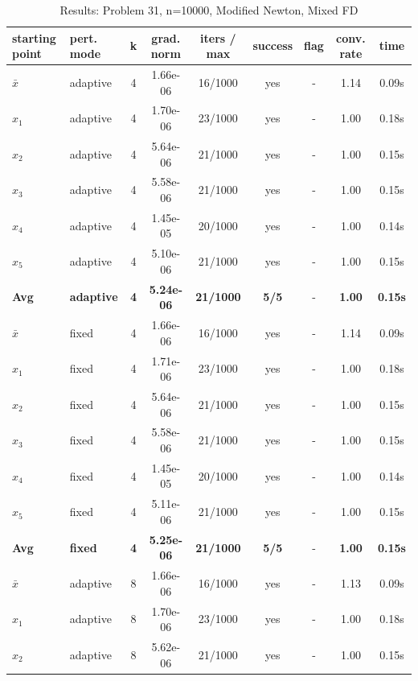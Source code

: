 \begin{longtable}{|l|l|c|c|c|c|c|c|c|}
\caption{Results: Problem 31, n=10000, Modified Newton, Mixed FD} \\
\hline
\textbf{starting point} & \textbf{pert. mode} & \textbf{k} & \textbf{grad. norm} & \textbf{iters / max} & \textbf{success} & \textbf{flag} & \textbf{conv. rate} & \textbf{time} \\
\hline
\endfirsthead
\endhead
\endfoot
\hline
\endlastfoot
$\bar{x}$ & adaptive & 4 & 1.66e-06 & 16/1000 & yes & - & 1.14 & 0.09s \\
\hline
$x_1$ & adaptive & 4 & 1.70e-06 & 23/1000 & yes & - & 1.00 & 0.18s \\
\hline
$x_2$ & adaptive & 4 & 5.64e-06 & 21/1000 & yes & - & 1.00 & 0.15s \\
\hline
$x_3$ & adaptive & 4 & 5.58e-06 & 21/1000 & yes & - & 1.00 & 0.15s \\
\hline
$x_4$ & adaptive & 4 & 1.45e-05 & 20/1000 & yes & - & 1.00 & 0.14s \\
\hline
$x_5$ & adaptive & 4 & 5.10e-06 & 21/1000 & yes & - & 1.00 & 0.15s \\
\hline
\hline\hline
\textbf{Avg} & \textbf{adaptive} & \textbf{4} & \textbf{5.24e-06} & \textbf{21/1000} & \textbf{5/5} & - & \textbf{1.00} & \textbf{0.15s} \\
\hline\hline
\hline
$\bar{x}$ & fixed & 4 & 1.66e-06 & 16/1000 & yes & - & 1.14 & 0.09s \\
\hline
$x_1$ & fixed & 4 & 1.71e-06 & 23/1000 & yes & - & 1.00 & 0.18s \\
\hline
$x_2$ & fixed & 4 & 5.64e-06 & 21/1000 & yes & - & 1.00 & 0.15s \\
\hline
$x_3$ & fixed & 4 & 5.58e-06 & 21/1000 & yes & - & 1.00 & 0.15s \\
\hline
$x_4$ & fixed & 4 & 1.45e-05 & 20/1000 & yes & - & 1.00 & 0.14s \\
\hline
$x_5$ & fixed & 4 & 5.11e-06 & 21/1000 & yes & - & 1.00 & 0.15s \\
\hline
\hline\hline
\textbf{Avg} & \textbf{fixed} & \textbf{4} & \textbf{5.25e-06} & \textbf{21/1000} & \textbf{5/5} & - & \textbf{1.00} & \textbf{0.15s} \\
\hline\hline
$\bar{x}$ & adaptive & 8 & 1.66e-06 & 16/1000 & yes & - & 1.13 & 0.09s \\
\hline
$x_1$ & adaptive & 8 & 1.70e-06 & 23/1000 & yes & - & 1.00 & 0.18s \\
\hline
$x_2$ & adaptive & 8 & 5.62e-06 & 21/1000 & yes & - & 1.00 & 0.15s \\

\end{longtable}
